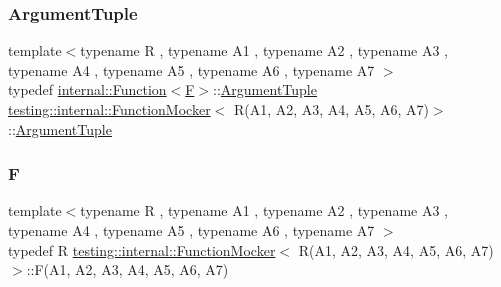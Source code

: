 \subsubsection{\texorpdfstring{ArgumentTuple}{ArgumentTuple}}
{\footnotesize\ttfamily template$<$typename R , typename A1 , typename A2 , typename A3 , typename A4 , typename A5 , typename A6 , typename A7 $>$ \\
typedef \mbox{\hyperlink{structtesting_1_1internal_1_1_function}{internal\+::\+Function}}$<$\mbox{\hyperlink{classtesting_1_1internal_1_1_function_mocker_3_01_r_07_a1_00_01_a2_00_01_a3_00_01_a4_00_01_a5_00_01_a6_00_01_a7_08_4_a2ea0e33d9cc0d1f57d58b4aee98c117c}{F}}$>$\+::\mbox{\hyperlink{classtesting_1_1internal_1_1_function_mocker_3_01_r_07_a1_00_01_a2_00_01_a3_00_01_a4_00_01_a5_00_01_a6_00_01_a7_08_4_a313911b9c80b57c8c25f0ad5ef2d0bdc}{Argument\+Tuple}} \mbox{\hyperlink{classtesting_1_1internal_1_1_function_mocker}{testing\+::internal\+::\+Function\+Mocker}}$<$ R(A1, A2, A3, A4, A5, A6, A7)$>$\+::\mbox{\hyperlink{classtesting_1_1internal_1_1_function_mocker_3_01_r_07_a1_00_01_a2_00_01_a3_00_01_a4_00_01_a5_00_01_a6_00_01_a7_08_4_a313911b9c80b57c8c25f0ad5ef2d0bdc}{Argument\+Tuple}}}

\mbox{\label{classtesting_1_1internal_1_1_function_mocker_3_01_r_07_a1_00_01_a2_00_01_a3_00_01_a4_00_01_a5_00_01_a6_00_01_a7_08_4_a2ea0e33d9cc0d1f57d58b4aee98c117c}} 
\subsubsection{\texorpdfstring{F}{F}}
{\footnotesize\ttfamily template$<$typename R , typename A1 , typename A2 , typename A3 , typename A4 , typename A5 , typename A6 , typename A7 $>$ \\
typedef R \mbox{\hyperlink{classtesting_1_1internal_1_1_function_mocker}{testing\+::internal\+::\+Function\+Mocker}}$<$ R(A1, A2, A3, A4, A5, A6, A7)$>$\+::F(A1, A2, A3, A4, A5, A6, A7)}



